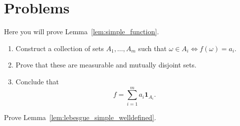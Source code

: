



\section{Problems}

\begin{problem}\label{prb:standard_representation_simple}
Here you will prove Lemma~\ref{lem:simple_function}.
\begin{enumerate}[label=(\alph*)]
\item Construct a collection of sets $A_1,\dots, A_m$ such that $\omega \in A_i \iff f(\omega) = a_i$.
\item Prove that these are measurable and mutually disjoint sets.
\item Conclude that
\[
	f = \sum_{i = 1}^m a_i \mathbf{1}_{A_i}.
\]
\end{enumerate}
\end{problem}

\begin{problem}\label{prb:lebesgue_simple_welldefined}
Prove Lemma~\ref{lem:lebesgue_simple_welldefined}.
\end{problem}

